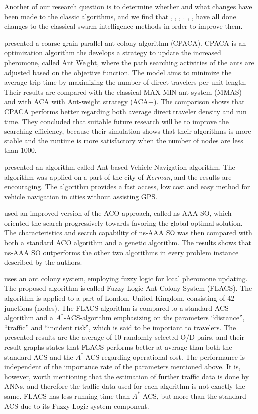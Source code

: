 Another of our research question is to determine whether and what changes have been made to the classic algorithms, and we find that \citet{yang07}, \citet{salehi-nezhad07}, \citet{tripathi09}, \citet{salehinejad10}. \citet{jiang10}, \citet{dias14}, \citet{sedighpour14} have all done changes to the classical swarm intelligence methods in order to improve them.
\par
\citet{yang07} presented a coarse-grain parallel ant colony algorithm (CPACA). CPACA is an optimization algorithm the develops a strategy to update the increased pheromone, called Ant Weight, where the path searching activities of the ants are adjusted based on the objective function. The model aims to minimize the average trip time by maximizing the number of direct travelers per unit length. Their results are compared with the classical MAX-MIN ant system (MMAS)\citep{stutzle99} and with ACA with Ant-weight strategy (ACA+). The comparison shows that CPACA performs better regarding both average direct traveler density and run time. They concluded that suitable future research will be to improve the searching efficiency, because their simulation shows that their algorithms is more stable and the runtime is more satisfactory when the number of nodes are less than 1000. 
\par
\citet{salehi-nezhad07} presented an algorithm called Ant-based Vehicle Navigation algorithm. The algorithm was applied on a part of the city of \textit{Kerman}, and the results are encouraging. The algorithm provides a fast access, low cost and easy method for vehicle navigation in cities without assisting GPS.
\par
\citet{tripathi09} used an improved version of the ACO approach, called ns-AAA SO, which oriented the search progressively towards favoring the global optimal solution. The characteristics and search capability of ns-AAA SO was then compared with both a standard ACO algorithm and a genetic algorithm. The results shows that ns-AAA SO outperforms the other two algorithms in every problem instance described by the authors. 
\par
\citet{salehinejad10} uses an ant colony system, employing fuzzy logic for local pheromone updating. The proposed algorithm is called Fuzzy Logic-Ant Colony System (FLACS). The algorithm is applied to a part of London, United Kingdom, consisting of 42 junctions (nodes). The FLACS algorithm is compared to a standard ACS-algorithm and a $A^*$-ACS-algorithm emphasizing on the parameters ``distance'', ``traffic'' and ``incident risk'', which is said to be important to travelers. The presented results are the average of 10 randomly selected O/D pairs, and their result graphs states that FLACS performs better at average than both the standard ACS and the $A^*$-ACS regarding operational cost. The performance is independent of the importance rate of the parameters mentioned above. It is, however, worth mentioning that the estimation of further traffic data is done by ANNs, and therefore the traffic data used for each algorithm is not exactly the same. FLACS has less running time than $A^*$-ACS, but more than the standard ACS due to its Fuzzy Logic system component. 
